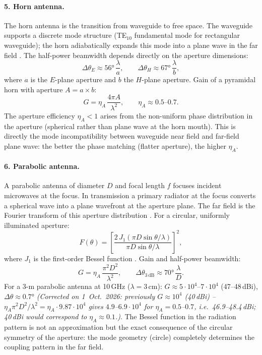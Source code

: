 \paragraph{5. Horn antenna.}

The horn antenna is the transition from waveguide to free space. The
waveguide supports a discrete mode structure (TE$_{10}$ fundamental mode
for rectangular waveguide); the horn adiabatically expands this mode into
a plane wave in the far field \cite{Balanis2016,Pozar2012}. The half-power
beamwidth depends directly on the aperture dimensions:
\[
  \Delta\theta_{E} \approx 56°\,\frac{\lambda}{a}, \qquad
  \Delta\theta_{H} \approx 67°\,\frac{\lambda}{b},
\]
where $a$ is the $E$-plane aperture and $b$ the $H$-plane aperture.
Gain of a pyramidal horn with aperture $A = a \times b$:
\[
  G = \eta_A\,\frac{4\pi A}{\lambda^2}, \qquad \eta_A \approx 0.5\text{--}0.7.
\]
The aperture efficiency $\eta_A < 1$ arises from the non-uniform phase
distribution in the aperture (spherical rather than plane wave at the
horn mouth). This is directly the mode incompatibility between waveguide
near field and far-field plane wave: the better the phase matching (flatter
aperture), the higher $\eta_A$.

\paragraph{6. Parabolic antenna.}

A parabolic antenna of diameter $D$ and focal length $f$ focuses incident
microwaves at the focus. In transmission a primary radiator at the focus
converts a spherical wave into a plane wavefront at the aperture plane.
The far field is the Fourier transform of this aperture distribution \EM.
For a circular, uniformly illuminated aperture:
\[
  F(\theta) = \left[\frac{2\,J_1(\pi D\sin\theta/\lambda)}
                        {\pi D\sin\theta/\lambda}\right]^2,
\]
where $J_1$ is the first-order Bessel function \cite{Balanis2016}. Gain
and half-power beamwidth:
\[
  G = \eta_A\,\frac{\pi^2 D^2}{\lambda^2}, \qquad
  \Delta\theta_{3\,\mathrm{dB}} \approx 70°\,\frac{\lambda}{D}.
\]
For a 3-m parabolic antenna at 10\,GHz ($\lambda = 3\,\mathrm{cm}$):
$G \approx 5\cdot10^4$--$7\cdot10^4$ (47--48\,dBi), $\Delta\theta \approx 0.7°$
\textit{(Corrected on 1~Oct.~2026: previously $G \approx 10^4$ (40\,dBi) -- $\eta_A\pi^2D^2/\lambda^2 = \eta_A\cdot9.87\cdot10^4$ gives $4.9$--$6.9\cdot10^4$ for $\eta_A = 0.5$--$0.7$, i.e.\ 46.9--48.4\,dBi; 40\,dBi would correspond to $\eta_A \approx 0.1$.)}. The Bessel
function in the radiation pattern is not an approximation but the exact
consequence of the circular symmetry of the aperture: the mode geometry
(circle) completely determines the coupling pattern in the far field.


